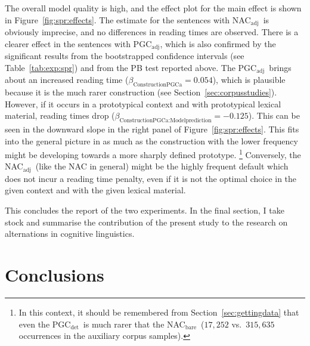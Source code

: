 \documentclass[USenglish]{article}
\newcommand{\Sub}[1]{\ensuremath{\mathrm{_{#1}}}}
\newcommand{\NACb}{NAC\Sub{bare}}
\newcommand{\NACa}{NAC\Sub{adj}}
\newcommand{\PGCd}{PGC\Sub{det}}
\newcommand{\PGCa}{PGC\Sub{adj}}
\begin{document}
The overall model quality is high, and the effect plot for the main effect is shown in Figure~\ref{fig:spr:effects}.
The estimate for the sentences with \NACa\ is obviously imprecise, and no differences in reading times are observed.
There is a clearer effect in the sentences with \PGCa, which is also confirmed by the significant results from the bootstrapped confidence intervals (see Table~\ref{tab:exp:spr}) and from the PB test reported above.
The \PGCa\ brings about an increased reading time ($\beta_{\text{ConstructionPGCa}}=0.054$), which is plausible because it is the much rarer construction (see Section~\ref{sec:corpusstudies}).
However, if it occurs in a prototypical context and with prototypical lexical material, reading times drop ($\beta_{\text{ConstructionPGCa:Modelprediction}}=-0.125$).
This can be seen in the downward slope in the right panel of Figure~\ref{fig:spr:effects}.
This fits into the general picture in as much as the construction with the lower frequency might be developing towards a more sharply defined prototype.%
\footnote{In this context, it should be remembered from Section~\ref{sec:gettingdata} that even the \PGCd\ is much rarer that the \NACb\ ($17,252$ vs.\ $315,635$ occurrences in the auxiliary corpus samples).}
Conversely, the \NACa\ (like the NAC in general) might be the highly frequent default which does not incur a reading time penalty, even if it is not the optimal choice in the given context and with the given lexical material.

This concludes the report of the two experiments.
In the final section, I take stock and summarise the contribution of the present study to the research on alternations in cognitive linguistics.




\section{Conclusions}
\label{sec:conclusion}
\end{document}
